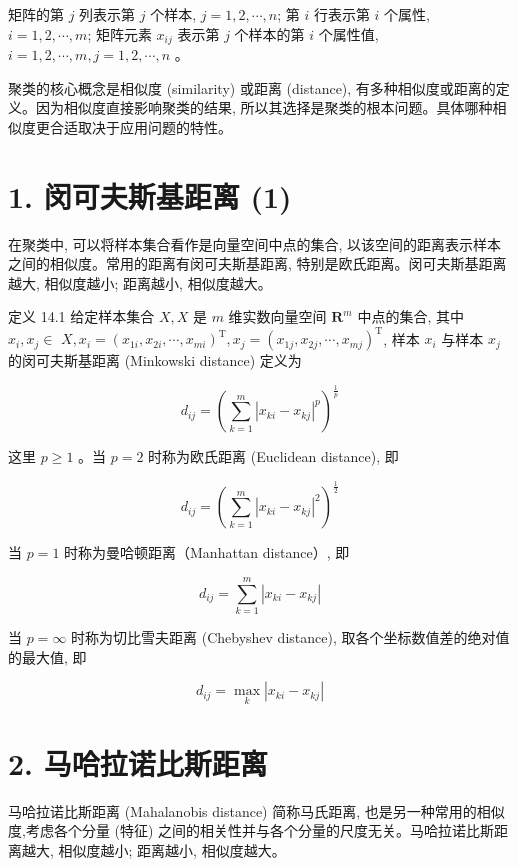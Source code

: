 \documentclass[10pt]{article}
\begin{document}
\begin{CJK*}{UTF8}{bsmi}
矩阵的第 $j$ 列表示第 $j$ 个样本, $j=1,2, \cdots, n$; 第 $i$ 行表示第 $i$ 个属性, $i=1,2, \cdots, m$; 矩阵元素 $x_{i j}$ 表示第 $j$ 个样本的第 $i$ 个属性值, $i=1,2, \cdots, m, j=1,2, \cdots, n$ 。

聚类的核心概念是相似度 (similarity) 或距离 (distance), 有多种相似度或距离的定义。因为相似度直接影响聚类的结果, 所以其选择是聚类的根本问题。具体哪种相似度更合适取决于应用问题的特性。

\section*{1. 闵可夫斯基距离 (1)}
在聚类中, 可以将样本集合看作是向量空间中点的集合, 以该空间的距离表示样本之间的相似度。常用的距离有闵可夫斯基距离, 特别是欧氏距离。闵可夫斯基距离越大, 相似度越小; 距离越小, 相似度越大。

定义 14.1 给定样本集合 $X, X$ 是 $m$ 维实数向量空间 $\boldsymbol{R}^{m}$ 中点的集合, 其中 $x_{i}, x_{j} \in$ $X, x_{i}=\left(x_{1 i}, x_{2 i}, \cdots, x_{m i}\right)^{\mathrm{T}}, x_{j}=\left(x_{1 j}, x_{2 j}, \cdots, x_{m j}\right)^{\mathrm{T}}$, 样本 $x_{i}$ 与样本 $x_{j}$ 的闵可夫斯基距离 (Minkowski distance) 定义为


\begin{equation*}
d_{i j}=\left(\sum_{k=1}^{m}\left|x_{k i}-x_{k j}\right|^{p}\right)^{\frac{1}{p}} \tag{14.2}
\end{equation*}


这里 $p \geqslant 1$ 。当 $p=2$ 时称为欧氏距离 (Euclidean distance), 即


\begin{equation*}
d_{i j}=\left(\sum_{k=1}^{m}\left|x_{k i}-x_{k j}\right|^{2}\right)^{\frac{1}{2}} \tag{14.3}
\end{equation*}


当 $p=1$ 时称为曼哈顿距离（Manhattan distance）, 即


\begin{equation*}
d_{i j}=\sum_{k=1}^{m}\left|x_{k i}-x_{k j}\right| \tag{14.4}
\end{equation*}


当 $p=\infty$ 时称为切比雪夫距离 (Chebyshev distance), 取各个坐标数值差的绝对值的最大值, 即


\begin{equation*}
d_{i j}=\max _{k}\left|x_{k i}-x_{k j}\right| \tag{14.5}
\end{equation*}


\section*{2. 马哈拉诺比斯距离}
马哈拉诺比斯距离 (Mahalanobis distance) 简称马氏距离, 也是另一种常用的相似度,考虑各个分量 (特征) 之间的相关性并与各个分量的尺度无关。马哈拉诺比斯距离越大, 相似度越小; 距离越小, 相似度越大。


\end{CJK*}
\end{document}

